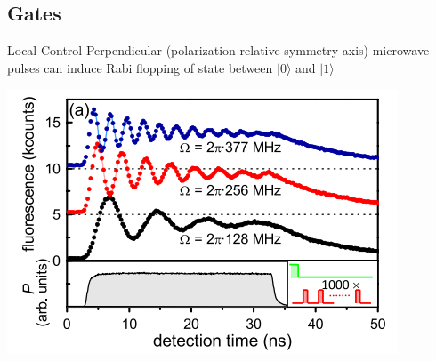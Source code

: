 \documentclass[11pt]{beamer}
\begin{document}
\subsection{Gates}
\begin{frame}{Local Control}
Perpendicular (polarization relative symmetry axis) microwave pulses can induce Rabi flopping of state between $\vert 0 \rangle$ and $\vert 1 \rangle$ 

\begin{center}
\includegraphics[scale=1]{rabi.png} $\ \ $ \cite{PhysRevLett.105.177403}
\end{center}


\end{frame}

\end{document}
